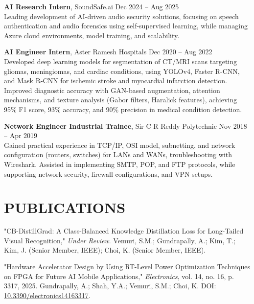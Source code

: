 \documentclass[8pt,letterpaper]{article}
\begin{document}
\vspace{0.1em}
\textbf{AI Research Intern}, SoundSafe.ai \hfill Dec 2024 – Aug 2025\\
Leading development of AI-driven audio security solutions, focusing on speech authentication and audio forensics using self-supervised learning, while managing Azure cloud environments, model training, and scalability.

\vspace{0.1em}
\textbf{AI Engineer Intern}, Aster Ramesh Hospitals \hfill Dec 2020 – Aug 2022\\
Developed deep learning models for segmentation of CT/MRI scans targeting gliomas, meningiomas, and cardiac conditions, using YOLOv4, Faster R-CNN, and Mask R-CNN for ischemic stroke and myocardial infarction detection. Improved diagnostic accuracy with GAN-based augmentation, attention mechanisms, and texture analysis (Gabor filters, Haralick features), achieving 95\% F1 score, 93\% accuracy, and 90\% precision in medical condition detection.

\vspace{0.1em}
\textbf{Network Engineer Industrial Trainee}, Sir C R Reddy Polytechnic \hfill Nov 2018 – Apr 2019\\
Gained practical experience in TCP/IP, OSI model, subnetting, and network configuration (routers, switches) for LANs and WANs, troubleshooting with Wireshark. Assisted in implementing SMTP, POP, and FTP protocols, while supporting network security, firewall configurations, and VPN setups.

\section{PUBLICATIONS}

\vspace{0.5em}
"CB-DistillGrad: A Class-Balanced Knowledge Distillation Loss for Long-Tailed Visual Recognition," 
\textit{Under Review}. 
Vemuri, S.M.; Gundrapally, A.; Kim, T.; Kim, J. (Senior Member, IEEE); Choi, K. (Senior Member, IEEE).

\vspace{0.5em}
"Hardware Accelerator Design by Using RT-Level Power Optimization Techniques on FPGA for Future AI Mobile Applications," 
\textit{Electronics}, vol. 14, no. 16, p. 3317, 2025. 
Gundrapally, A.; Shah, Y.A.; Vemuri, S.M.; Choi, K. 
DOI: \href{https://doi.org/10.3390/electronics14163317}{10.3390/electronics14163317}.
\end{document}
